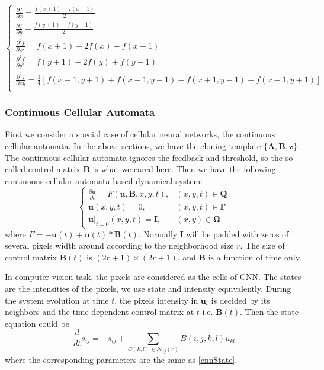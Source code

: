 \documentclass{amsart}
\theoremstyle{definition}
\theoremstyle{remark}
\numberwithin{equation}{section}
\begin{document}
\begin{equation}
  \begin{cases}
  \frac{\partial f}{\partial x} = \frac{f(x+1) - f(x-1)}{2} \\
  \frac{\partial f}{\partial y} = \frac{f(y+1) - f(y-1)}{2} \\
  \frac{\partial ^2 f}{\partial x^2} = f(x+1) - 2f(x) + f(x-1) \\
  \frac{\partial ^2 f}{\partial y^2} = f(y+1) - 2f(y) + f(y-1) \\
  \frac{\partial ^2 f}{\partial xy} =  \frac{1}{4}[ f(x+1, y+1) + f(x-1, y-1) - f(x+1, y-1) - f(x-1, y+1)]\\
    \end{cases}
\end{equation}








\subsubsection{Continuous Cellular Automata}
First we consider a special case of cellular neural networks, the continuous cellular automata. 
In the above sections, we have the cloning template $\{\mathbf{A}, \mathbf{B}, \mathbf{z}\}$. The continuous cellular automata ignores the feedback and threshold, so the so-called control matrix $\mathbf{B}$ is what we cared here.
Then we have the following continuous cellular automata based dynamical system:
\begin{equation}
\label{cnnEvolution}
  \begin{cases}
    \frac{\partial \mathbf{u}}{\partial t} = F(\mathbf{u},  \mathbf{B}, x, y, t), &  (x, y, t) \in \mathbf{Q}\\
	\mathbf{u}(x, y, t) = 0, & (x, y, t) \in  \mathbf{\Gamma} \\
	\mathbf{u}|_{t=0}(x, y, t) = \mathbf{I}, & (x, y)\in \mathbf{\Omega}
  \end{cases}
\end{equation}
where 
$F = -  \mathbf{u}(t)  + \mathbf{u}(t) * \mathbf{B}(t)$.
Normally $\mathbf{I}$ will be padded with zeros of several pixels width around according to the neighborhood size $r$.
The size of control matrix $\mathbf{B}(t)$ is $(2r + 1) \times (2r + 1)$, and $\mathbf{B} $ is a function of time only.

In computer vision task, the pixels are considered as the cells of CNN. The states are the intensities of the pixels, we use state and intensity equivalently. During the system evolution at time $t$, the pixels intensity in $\mathbf{u}_t$ is decided by its neighbors and the time dependent control matrix at $t$ i.e. $\mathbf{B}(t)$.
Then the state equation could be 
\begin{equation}
\frac{d}{dt}s_{ij} = -s_{ij}  + \sum_{C(k,l) \in \mathcal{N}_{ij}(r)}B(i, j, k, l)u_{kl} 
\end{equation}
where the corresponding parameters are the same as \ref{cnnState}.
\end{document}
